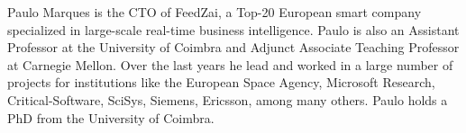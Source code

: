 Paulo Marques is the CTO of FeedZai, a Top-20 European smart company specialized in large-scale real-time business intelligence. Paulo is also an Assistant Professor at the University of Coimbra and Adjunct Associate Teaching Professor at Carnegie Mellon. Over the last years he lead and worked in a large number of projects for institutions like the European Space Agency, Microsoft Research, Critical-Software, SciSys, Siemens, Ericsson, among many others. Paulo holds a PhD from the University of Coimbra.


